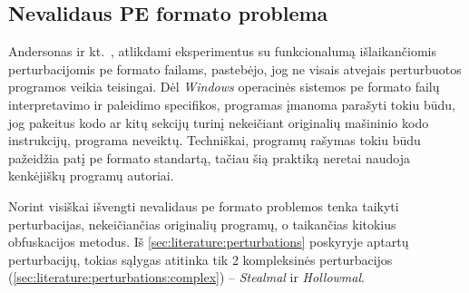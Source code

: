 \subsection{Nevalidaus PE formato problema}\label{sec:literature:pe_invalid}

Andersonas ir kt.~\cite{andersonLearningEvadeStatic2018}, atlikdami eksperimentus su funkcionalumą išlaikančiomis perturbacijomis \gls{pe} formato failams, pastebėjo, jog ne visais atvejais perturbuotos programos veikia teisingai. Dėl \textit{Windows} operacinės sistemos \gls{pe} formato failų interpretavimo ir paleidimo specifikos, programas įmanoma parašyti tokiu būdu, jog pakeitus kodo ar kitų sekcijų turinį nekeičiant originalių mašininio kodo instrukcijų, programa neveiktų. Techniškai, programų rašymas tokiu būdu pažeidžia patį \gls{pe} formato standartą, tačiau šią praktiką neretai naudoja kenkėjiškų programų autoriai.

Norint visiškai išvengti nevalidaus \gls{pe} formato problemos tenka taikyti perturbacijas, nekeičiančias originalių programų, o taikančias kitokius obfuskacijos metodus. Iš \ref{sec:literature:perturbations} poskyryje aptartų perturbacijų, tokias sąlygas atitinka tik 2 kompleksinės perturbacijos (\ref{sec:literature:perturbations:complex}) -- \textit{Stealmal} ir \textit{Hollowmal}.